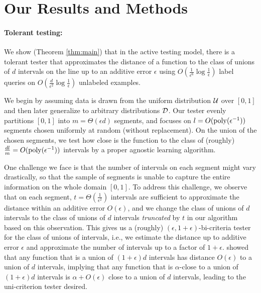 \section{Our Results and Methods}
\label{sec:results}
\paragraph{Tolerant testing:}
We show (Theorem \ref{thm:main}) that in the active testing model, there is a tolerant tester that approximates the distance of a function to the class of unions of $d$ intervals on the line up to an additive error $\epsilon$ using $O(\frac{1}{\epsilon^6}\log\frac{1}{\epsilon})$ label queries on $O(\frac{d}{\epsilon^2}\log\frac{1}{\epsilon})$ unlabeled examples.

We begin by assuming data is drawn from the uniform distribution ${\mathcal{U}}$ over $[0,1]$ and then later generalize to arbitrary distributions ${\mathcal{D}}$. Our tester evenly partitions $[0,1]$ into $m=\Theta(\epsilon d)$ segments, and focuses on $l=O({\mathrm{poly}}(\epsilon^{-1}))$ segments chosen uniformly at random (without replacement). On the union of the chosen segments, we test how close is the function to the class of (roughly) $\frac{dl}{m}=O({\mathrm{poly}}(\epsilon^{-1}))$ intervals by a proper agnostic learning algorithm.

One challenge we face is that the number of intervals on each segment might vary drastically, so that the sample of segments is unable to capture the entire information on the whole domain $[0,1]$. To address this challenge, we observe that on each segment,  $t=\Theta(\frac 1{\epsilon^2})$ intervals are sufficient to approximate the distance within an additive error $O(\epsilon)$, and we change the class of unions of $d$ intervals to the class of unions of $d$ intervals \emph{truncated} by $t$ in our algorithm based on this observation. This gives us a (roughly) $(\epsilon,1+\epsilon)$-bi-criteria tester for the class of unions of intervals, i.e., we estimate the distance up to additive error $\epsilon$ and approximate the number of intervals up to a factor of $1+\epsilon$. \citet{BBBY12} showed that any function that is a union of $(1+\epsilon)d$ intervals has distance $O(\epsilon)$ to a union of $d$ intervals, implying that any function that is $\alpha$-close to a union of $(1+\epsilon)d$ intervals is $\alpha+O(\epsilon)$ close to a union of $d$ intervals,  leading to the uni-criterion tester desired.

